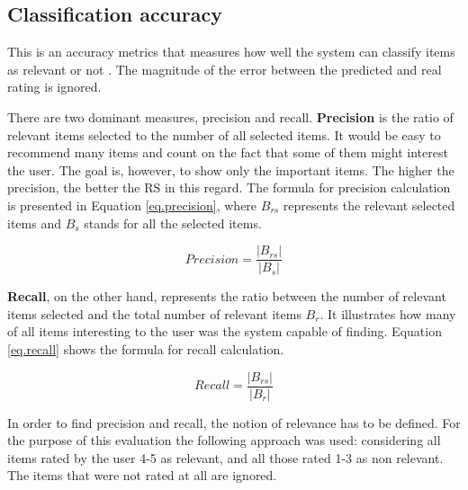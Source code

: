 \documentclass[12pt]{report}
\begin{document}
\subsection{Classification accuracy}

This is an accuracy metrics that measures how well the system can classify items as relevant or not \cite{eval_twente}. The magnitude of the error between the predicted and real rating is ignored.

There are two dominant measures, precision and recall. {\bf Precision} is the ratio of relevant items selected to the number of all selected items. It would be easy to recommend many items and count on the fact that some of them might interest the user. The goal is, however, to show only the important items. The higher the precision, the better the RS in this regard. The formula for precision calculation is presented in Equation \ref{eq.precision}, where $B_{rs}$ represents the relevant selected items and $B_s$ stands for all the selected items.

\begin{equation}
Precision = \frac{|B_{rs}|}{|B_{s}|}
\label{eq.precision}
\end{equation}
\hbox{}

{\bf Recall}, on the other hand, represents the ratio between the number of relevant items selected and the total number of relevant items $B_r$. It illustrates how many of all items interesting to the user was the system capable of finding. Equation \ref{eq.recall} shows the formula for recall calculation.

\begin{equation}
Recall = \frac{|B_{rs}|}{|B_{r}|}
\label{eq.recall}
\end{equation}
\hbox{}

In order to find precision and recall, the notion of relevance has to be defined. For the purpose of this evaluation the following approach was used: considering all items rated by the user 4-5 as relevant, and all those rated 1-3 as non relevant. The items that were not rated at all are ignored.
\end{document}
